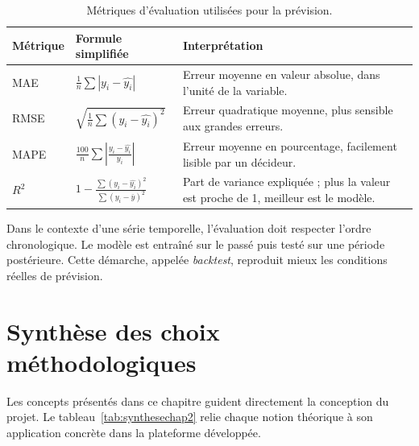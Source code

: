 \begin{table}[H]
\centering
\caption[Métriques d'évaluation des modèles]{Métriques d'évaluation utilisées pour la prévision.}
\label{tab:metriques}
\begin{tabularx}{\linewidth}{|p{2.5cm}|p{4.2cm}|X|}
\hline
\textbf{Métrique} & \textbf{Formule simplifiée} & \textbf{Interprétation} \\ \hline
MAE & $\frac{1}{n}\sum |y_i-\hat{y_i}|$ & Erreur moyenne en valeur absolue, dans l'unité de la variable. \\ \hline
RMSE & $\sqrt{\frac{1}{n}\sum (y_i-\hat{y_i})^2}$ & Erreur quadratique moyenne, plus sensible aux grandes erreurs. \\ \hline
MAPE & $\frac{100}{n}\sum |\frac{y_i-\hat{y_i}}{y_i}|$ & Erreur moyenne en pourcentage, facilement lisible par un décideur. \\ \hline
$R^2$ & $1-\frac{\sum(y_i-\hat{y_i})^2}{\sum(y_i-\bar{y})^2}$ & Part de variance expliquée ; plus la valeur est proche de 1, meilleur est le modèle. \\ \hline
\end{tabularx}
\end{table}

\par Dans le contexte d'une série temporelle, l'évaluation doit respecter
l'ordre chronologique. Le modèle est entraîné sur le passé puis testé sur une
période postérieure. Cette démarche, appelée \textit{backtest}, reproduit mieux
les conditions réelles de prévision.

\section{Synthèse des choix méthodologiques}
\label{sec:synthese_chap2}
\par Les concepts présentés dans ce chapitre guident directement la conception
du projet. Le tableau~\ref{tab:synthesechap2} relie chaque notion théorique à
son application concrète dans la plateforme développée.

